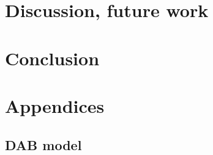 \documentclass[11pt]{article}
\begin{document}





\section{Discussion, future work}



\section{Conclusion}


\section*{Appendices}

\subsection*{DAB model}
\end{document}
